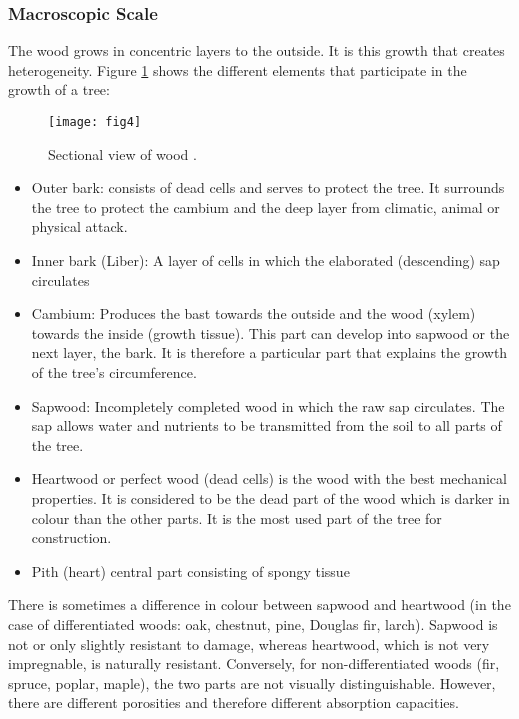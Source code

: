 \subsubsection{Macroscopic Scale}

The wood grows in concentric layers to the outside. It is this growth that creates heterogeneity. Figure \ref{fig:fig4} shows the different elements that participate in the growth of a tree:

\begin{figure}[bp]
	\centering
	\texttt{[image: fig4]}
	\caption{Sectional view of wood \citep{Seddik2006phd}.}
	\label{fig:fig4}
\end{figure}

\begin{itemize}
	\item Outer bark: consists of dead cells and serves to protect the tree. It surrounds the tree to protect the cambium and the deep layer from climatic, animal or physical attack. 
	\item Inner bark (Liber): A layer of cells in which the elaborated (descending) sap circulates
	\item Cambium: Produces the bast towards the outside and the wood (xylem) towards the inside (growth tissue). This part can develop into sapwood or the next layer, the bark. It is therefore a particular part that explains the growth of the tree's circumference.
	\item Sapwood: Incompletely completed wood in which the raw sap circulates. The sap allows water and nutrients to be transmitted from the soil to all parts of the tree.
	\item Heartwood or perfect wood (dead cells) is the wood with the best mechanical properties. It is considered to be the dead part of the wood which is darker in colour than the other parts. It is the most used part of the tree for construction.
	\item Pith (heart) central part consisting of spongy tissue
\end{itemize}

There is sometimes a difference in colour between sapwood and heartwood (in the case of differentiated woods: oak, chestnut, pine, Douglas fir, larch). Sapwood is not or only slightly resistant to damage, whereas heartwood, which is not very impregnable, is naturally resistant. Conversely, for non-differentiated woods (fir, spruce, poplar, maple), the two parts are not visually distinguishable. However, there are different porosities and therefore different absorption capacities.


